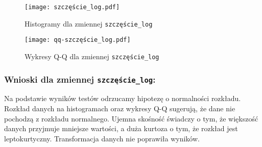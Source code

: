 \documentclass[12pt,a4paper]{article}
\begin{document}
\begin{figure}[H]
    \centering
    \texttt{[image: szczęście\_log.pdf]}
    \caption{Histogramy dla zmiennej \texttt{szczęście\_log}}
\end{figure}
\begin{figure}[H]
    \centering
    \texttt{[image: qq-szczęście\_log.pdf]}
    \caption{Wykresy Q-Q dla zmiennej \texttt{szczęście\_log}}
\end{figure}
\subsubsection*{Wnioski dla zmiennej \texttt{szczęście\_log}:}
Na podstawie wyników testów odrzucamy hipotezę o normalności rozkładu. Rozkład danych na histogramach oraz wykresy Q-Q sugerują, że dane nie pochodzą z rozkładu normalnego. Ujemna skośność świadczy o tym, że większość danych przyjmuje mniejsze wartości, a duża kurtoza o tym, że rozkład jest leptokurtyczny. Transformacja danych nie poprawiła wyników.
\end{document}
